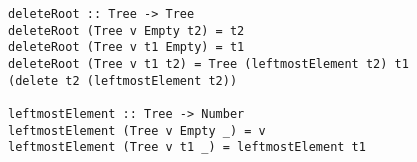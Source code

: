 \begin{figure}[!htb]
\begin{lstlisting}
deleteRoot :: Tree -> Tree                                                                           
deleteRoot (Tree v Empty t2) = t2                                                                    
deleteRoot (Tree v t1 Empty) = t1                                                                    
deleteRoot (Tree v t1 t2) = Tree (leftmostElement t2) t1 (delete t2 (leftmostElement t2))       

leftmostElement :: Tree -> Number                                                                    
leftmostElement (Tree v Empty _) = v                                                                 
leftmostElement (Tree v t1 _) = leftmostElement t1

\end{lstlisting}
\end{figure}